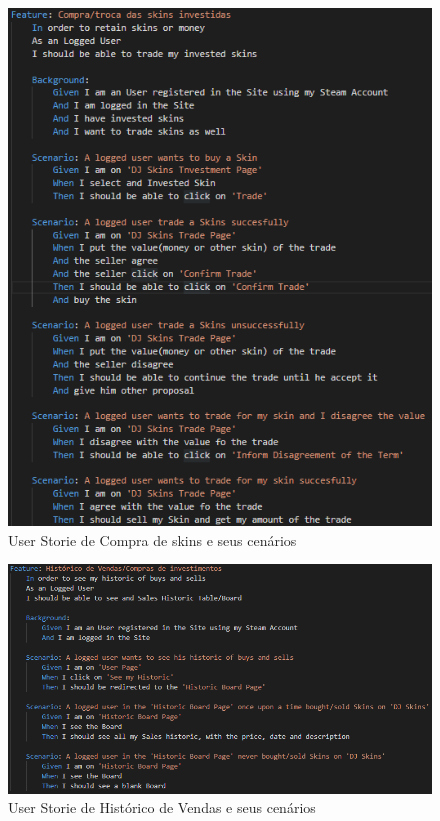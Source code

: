 \documentclass[
    12pt,               %
    openright,          %
    oneside,
    a4paper,            %
    MODELO,             %
    TODO,               %
    english,            %
    brazil              %
    ]{ifsp-spo-inf-ctds} %
\begin{document}
\begin{apendicesenv}
	\begin{figure}[!htb]
		\centering
		\includegraphics[scale=0.9]{Imagens/CompraSkins.png}
		\caption{User Storie de Compra de skins e seus cenários}
	\end{figure}

	\begin{figure}[!htb]
		\centering
		\includegraphics[scale=0.9]{Imagens/Historico.png}
		\caption{User Storie de Histórico de Vendas e seus cenários}
	\end{figure}


\end{apendicesenv}
\end{document}
